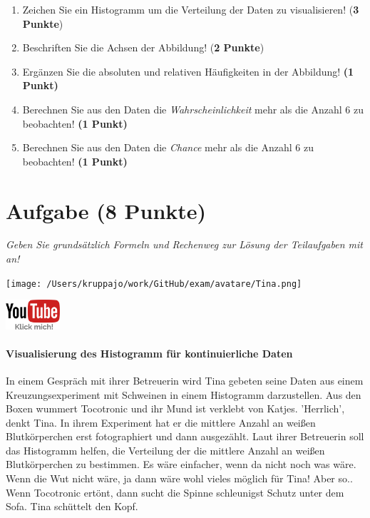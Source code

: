 \documentclass[a4paper, 9pt]{scrartcl}\usepackage[]{graphicx}\usepackage[]{xcolor}
\begin{document}
\begin{enumerate}
\item Zeichen Sie ein Histogramm um die Verteilung der Daten zu visualisieren! (\textbf{3 Punkte})
\item Beschriften Sie die Achsen der Abbildung! (\textbf{2 Punkte})
\item Ergänzen Sie die absoluten und relativen Häufigkeiten in der
  Abbildung! \textbf{(1 Punkt)}
\item Berechnen Sie aus den Daten die \textit{Wahrscheinlichkeit}
  mehr als die Anzahl 6 zu beobachten! \textbf{(1
    Punkt)}
\item Berechnen Sie aus den Daten die \textit{Chance} mehr
  als die Anzahl 6 zu beobachten! \textbf{(1 Punkt)}
\end{enumerate}

 
\clearpage

\section{Aufgabe \hfill (8 Punkte)}

\textit{Geben Sie grundsätzlich Formeln und Rechenweg zur Lösung der Teilaufgaben mit an!} \\[1Ex]
 

 
\begin{minipage}[t]{0.5\textwidth}
\texttt{[image: /Users/kruppajo/work/GitHub/exam/avatare/Tina.png]}
\end{minipage}
\begin{minipage}[t]{0.5\textwidth}
\hfill
\href{https://youtu.be/ORHSPTCdfeY}{\includegraphics[width = 2cm]{img/youtube}}
\end{minipage}
\vspace{-3ex}



\paragraph{Visualisierung des Histogramm für kontinuierliche Daten}

In einem Gespräch mit ihrer Betreuerin wird Tina gebeten seine Daten aus einem Kreuzungsexperiment mit Schweinen in einem Histogramm darzustellen. Aus den Boxen wummert Tocotronic und ihr Mund ist verklebt von Katjes. 'Herrlich', denkt Tina. In ihrem Experiment hat er die mittlere Anzahl an weißen Blutkörperchen erst fotographiert und dann ausgezählt. Laut ihrer Betreuerin soll das Histogramm helfen, die Verteilung der die mittlere Anzahl an weißen Blutkörperchen zu bestimmen.  Es wäre einfacher, wenn da nicht noch was wäre. Wenn die Wut nicht wäre, ja dann wäre wohl vieles möglich für Tina! Aber so.. Wenn Tocotronic ertönt, dann sucht die Spinne schleunigst Schutz unter dem Sofa. Tina schüttelt den Kopf.
\end{document}
